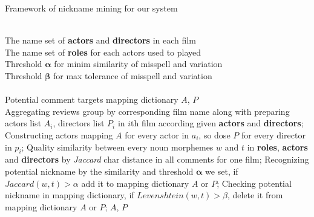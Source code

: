 \begin{algorithm}[htb]
\renewcommand{\algorithmicrequire}{\textbf{Input:}}
\renewcommand\algorithmicensure {\textbf{Output:} }
\caption{ Framework of nickname mining for our system}

\begin{algorithmic}[1]

\REQUIRE ~~\\
The name set of \textbf{actors} and \textbf{directors} in each film\\
The name set of \textbf{roles} for each actors used to played\\
Threshold $\boldsymbol\alpha$ for minim similarity of misspell and variation\\
Threshold $\boldsymbol\beta$ for max tolerance of misspell and variation\\

\ENSURE ~~\\
Potential comment targets mapping dictionary $A$, $P$\\

\STATE Aggregating reviews group by corresponding film name along with preparing actors list $A_i$, directors list $P_i$ in $i$th film according given \textbf{actors} and \textbf{directors};
\STATE Constructing actors mapping $A$ for every actor in $ a_i$, so dose $P$ for every director in $p_i$;
\STATE Quality similarity between every noun morphemes $w$ and $t$ in \textbf{roles}, \textbf{actors} and \textbf{directors} by \emph{Jaccard} char distance in all comments for one film;
\STATE Recognizing potential nickname by the similarity and threshold $\boldsymbol\alpha$ we set, if $Jaccard(w, t) > \alpha$ add it to mapping dictionary $A$ or $P$;
\STATE Checking potential nickname in mapping dictionary, if $Levenshtein(w, t) > \beta $, delete it from mapping dictionary $A$ or $P$;
\RETURN $A$, $P$

\end{algorithmic}
\label{alg:ner}
\end{algorithm}


